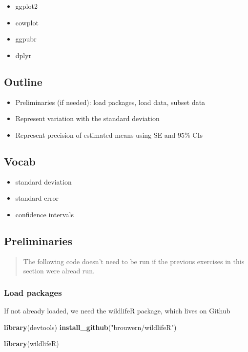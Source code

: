 \documentclass[]{book}
\newenvironment{Shaded}{\begin{snugshade}}{\end{snugshade}}
\newcommand{\KeywordTok}[1]{\textcolor[rgb]{0.13,0.29,0.53}{\textbf{#1}}}
\newcommand{\StringTok}[1]{\textcolor[rgb]{0.31,0.60,0.02}{#1}}
\newcommand{\NormalTok}[1]{#1}
\providecommand{\tightlist}{%
  \setlength{\itemsep}{0pt}\setlength{\parskip}{0pt}}
\theoremstyle{definition}
\theoremstyle{definition}
\theoremstyle{definition}
\theoremstyle{remark}
\begin{document}
\begin{itemize}
\tightlist
\item
  ggplot2
\item
  cowplot
\item
  ggpubr
\item
  dplyr
\end{itemize}

\subsection{Outline}\label{outline-4}

\begin{itemize}
\tightlist
\item
  Preliminaries (if needed): load packages, load data, subset data
\item
  Represent variation with the standard deviation
\item
  Represent precision of estimated means using SE and 95\% CIs
\end{itemize}

\subsection{Vocab}\label{vocab-1}

\begin{itemize}
\tightlist
\item
  standard deviation
\item
  standard error
\item
  confidence intervals
\end{itemize}

\subsection{Preliminaries}\label{preliminaries-3}

\begin{quote}
The following code doesn't need to be run if the previous exercises in
this section were alread run.
\end{quote}

\subsubsection{Load packages}\label{load-packages-2}

If not already loaded, we need the wildlifeR package, which lives on
Github

\begin{Shaded}
\begin{Highlighting}[]
\KeywordTok{library}\NormalTok{(devtools)}
\KeywordTok{install_github}\NormalTok{(}\StringTok{"brouwern/wildlifeR"}\NormalTok{)}

\KeywordTok{library}\NormalTok{(wildlifeR)}
\end{Highlighting}
\end{Shaded}
\end{document}
